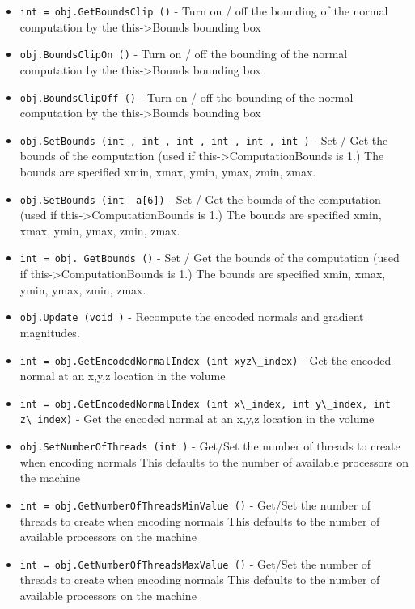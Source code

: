 \begin{itemize}
\item  \verb|int = obj.GetBoundsClip ()| -  Turn on / off the bounding of the normal computation by
 the this->Bounds bounding box

\item  \verb|obj.BoundsClipOn ()| -  Turn on / off the bounding of the normal computation by
 the this->Bounds bounding box

\item  \verb|obj.BoundsClipOff ()| -  Turn on / off the bounding of the normal computation by
 the this->Bounds bounding box

\item  \verb|obj.SetBounds (int , int , int , int , int , int )| -  Set / Get the bounds of the computation (used if 
 this->ComputationBounds is 1.) The bounds are specified
 xmin, xmax, ymin, ymax, zmin, zmax.

\item  \verb|obj.SetBounds (int  a[6])| -  Set / Get the bounds of the computation (used if 
 this->ComputationBounds is 1.) The bounds are specified
 xmin, xmax, ymin, ymax, zmin, zmax.

\item  \verb|int = obj. GetBounds ()| -  Set / Get the bounds of the computation (used if 
 this->ComputationBounds is 1.) The bounds are specified
 xmin, xmax, ymin, ymax, zmin, zmax.

\item  \verb|obj.Update (void )| -  Recompute the encoded normals and gradient magnitudes.

\item  \verb|int = obj.GetEncodedNormalIndex (int xyz\_index)| -  Get the encoded normal at an x,y,z location in the volume

\item  \verb|int = obj.GetEncodedNormalIndex (int x\_index, int y\_index, int z\_index)| -  Get the encoded normal at an x,y,z location in the volume

\item  \verb|obj.SetNumberOfThreads (int )| -  Get/Set the number of threads to create when encoding normals
 This defaults to the number of available processors on the machine

\item  \verb|int = obj.GetNumberOfThreadsMinValue ()| -  Get/Set the number of threads to create when encoding normals
 This defaults to the number of available processors on the machine

\item  \verb|int = obj.GetNumberOfThreadsMaxValue ()| -  Get/Set the number of threads to create when encoding normals
 This defaults to the number of available processors on the machine


\end{itemize}
